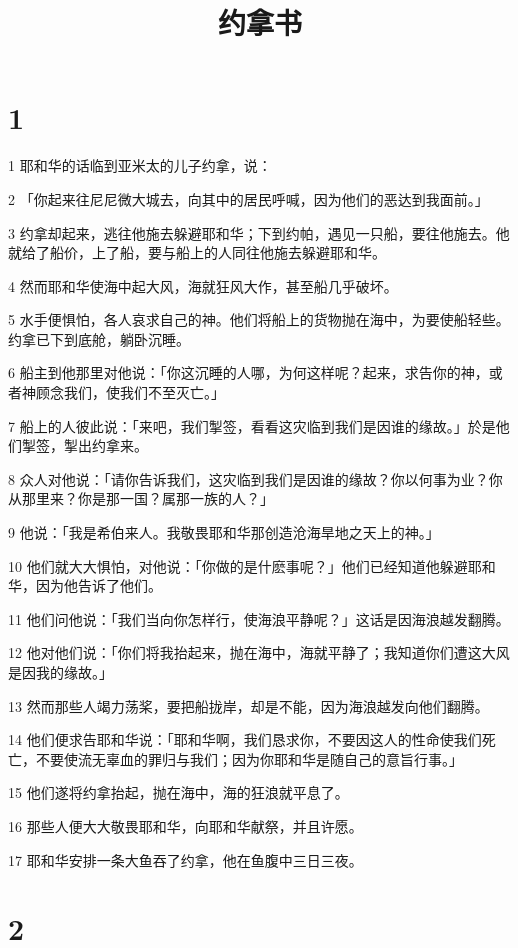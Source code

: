 

\title{约拿书}


\chapter{1}

\par 1 耶和华的话临到亚米太的儿子约拿，说：
\par 2 「你起来往尼尼微大城去，向其中的居民呼喊，因为他们的恶达到我面前。」
\par 3 约拿却起来，逃往他施去躲避耶和华；下到约帕，遇见一只船，要往他施去。他就给了船价，上了船，要与船上的人同往他施去躲避耶和华。
\par 4 然而耶和华使海中起大风，海就狂风大作，甚至船几乎破坏。
\par 5 水手便惧怕，各人哀求自己的神。他们将船上的货物抛在海中，为要使船轻些。约拿已下到底舱，躺卧沉睡。
\par 6 船主到他那里对他说：「你这沉睡的人哪，为何这样呢？起来，求告你的神，或者神顾念我们，使我们不至灭亡。」
\par 7 船上的人彼此说：「来吧，我们掣签，看看这灾临到我们是因谁的缘故。」於是他们掣签，掣出约拿来。
\par 8 众人对他说：「请你告诉我们，这灾临到我们是因谁的缘故？你以何事为业？你从那里来？你是那一国？属那一族的人？」
\par 9 他说：「我是希伯来人。我敬畏耶和华那创造沧海旱地之天上的神。」
\par 10 他们就大大惧怕，对他说：「你做的是什麽事呢？」他们已经知道他躲避耶和华，因为他告诉了他们。
\par 11 他们问他说：「我们当向你怎样行，使海浪平静呢？」这话是因海浪越发翻腾。
\par 12 他对他们说：「你们将我抬起来，抛在海中，海就平静了；我知道你们遭这大风是因我的缘故。」
\par 13 然而那些人竭力荡桨，要把船拢岸，却是不能，因为海浪越发向他们翻腾。
\par 14 他们便求告耶和华说：「耶和华啊，我们恳求你，不要因这人的性命使我们死亡，不要使流无辜血的罪归与我们；因为你耶和华是随自己的意旨行事。」
\par 15 他们遂将约拿抬起，抛在海中，海的狂浪就平息了。
\par 16 那些人便大大敬畏耶和华，向耶和华献祭，并且许愿。
\par 17 耶和华安排一条大鱼吞了约拿，他在鱼腹中三日三夜。

\chapter{2}

